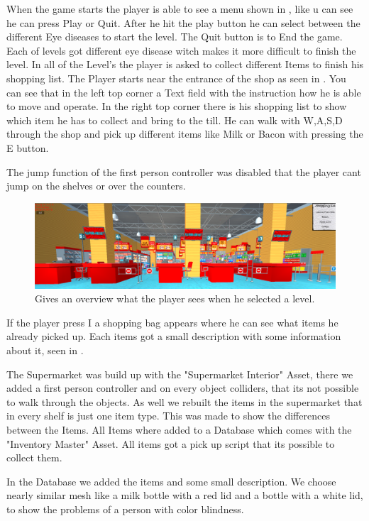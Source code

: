 \documentclass{sig-alternate-05-2015}
\begin{document}
When the game starts the player is able to see a menu shown in , like u can see he can press Play or Quit. After he hit the play button he can select between the different Eye diseases to start the level. The Quit button is to End the game. Each of levels got different eye disease witch makes it more difficult to finish the level. In all of the Level's the player is asked to collect different Items to finish his shopping list. The Player starts near the entrance of the shop as seen in . You can see that in the left top corner a Text field with the instruction how he is able to move and operate. In the right top corner there is his shopping list to show which item he has to collect and bring to the till. He can walk with W,A,S,D through the shop and pick up different items like Milk or Bacon with pressing the E button. 

The jump function of the first person controller was disabled that the player cant jump on the shelves or over the counters.

\begin{figure}
    \centering
    \includegraphics[width=\columnwidth]{Game.png}
    \caption{Gives an overview what the player sees when he selected a level.}
    \label{fig:gamestart}
\end{figure}

If the player press I a shopping bag appears where he can see what items he already picked up. Each items got a small description with some information about it, seen in . 

The Supermarket was build up with the "Supermarket Interior" Asset, there we added a first person controller and on every object colliders, that its not possible to walk through the objects. As well we rebuilt the items in the supermarket that in every shelf is just one item type. This was made to show the differences between the Items. All Items where added to a Database which comes with the "Inventory Master" Asset. All items got a pick up script that its possible to collect them. 

In the Database we added the items and some small description. We choose nearly similar mesh like a milk bottle with a red lid and a bottle with a white lid, to show the problems of a person with color blindness.
\end{document}
